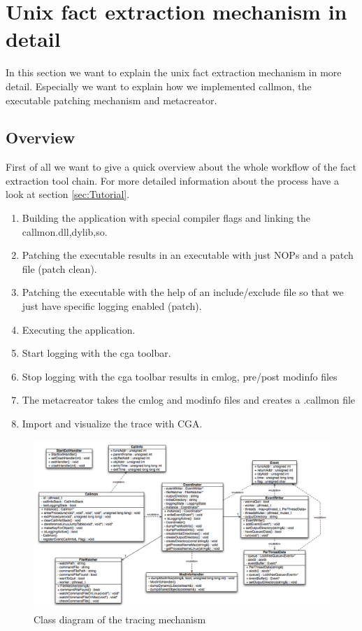 \section{Unix fact extraction mechanism in detail}

In this section we want to explain the unix fact extraction mechanism in more detail. Especially we want to explain how we implemented callmon, the executable patching mechanism and metacreator.

\subsection{Overview}

First of all we want to give a quick overview about the whole workflow of the fact extraction tool chain. For more detailed information about the process have a look at section \ref{sec:Tutorial}.

\begin{enumerate}
	\item Building the application with special compiler flags and linking the callmon.{dll,dylib,so}.
	\item Patching the executable results in an executable with just NOPs and a patch file (patch clean).
	\item Patching the executable with the help of an include/exclude file so that we just have specific logging enabled (patch).
	\item Executing the application.
	\item Start logging with the cga toolbar.
	\item Stop logging with the cga toolbar results in cmlog, pre/post modinfo files
	\item The metacreator takes the cmlog and modinfo files and creates a .callmon file
	\item Import and visualize the trace with CGA.
\end{enumerate}


\begin{figure}[ht]
\centering
\includegraphics[width=18cm]{images/callmon_class_diagram.png}
\caption{Class diagram of the tracing mechanism}
\end{figure}

